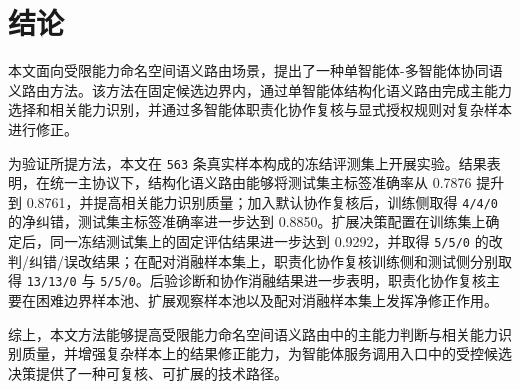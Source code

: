 \documentclass[10pt,a4paper,twocolumn,fontset=fandol]{ctexart}
\begin{document}
\section{结论}

本文面向受限能力命名空间语义路由场景，提出了一种单智能体-多智能体协同语义路由方法。该方法在固定候选边界内，通过单智能体结构化语义路由完成主能力选择和相关能力识别，并通过多智能体职责化协作复核与显式授权规则对复杂样本进行修正。

为验证所提方法，本文在 \texttt{563} 条真实样本构成的冻结评测集上开展实验。结果表明，在统一主协议下，结构化语义路由能够将测试集主标签准确率从 0.7876 提升到 0.8761，并提高相关能力识别质量；加入默认协作复核后，训练侧取得 \texttt{4/4/0} 的净纠错，测试集主标签准确率进一步达到 0.8850。扩展决策配置在训练集上确定后，同一冻结测试集上的固定评估结果进一步达到 0.9292，并取得 \texttt{5/5/0} 的改判/纠错/误改结果；在配对消融样本集上，职责化协作复核训练侧和测试侧分别取得 \texttt{13/13/0} 与 \texttt{5/5/0}。后验诊断和协作消融结果进一步表明，职责化协作复核主要在困难边界样本池、扩展观察样本池以及配对消融样本集上发挥净修正作用。

综上，本文方法能够提高受限能力命名空间语义路由中的主能力判断与相关能力识别质量，并增强复杂样本上的结果修正能力，为智能体服务调用入口中的受控候选决策提供了一种可复核、可扩展的技术路径。
\end{document}
